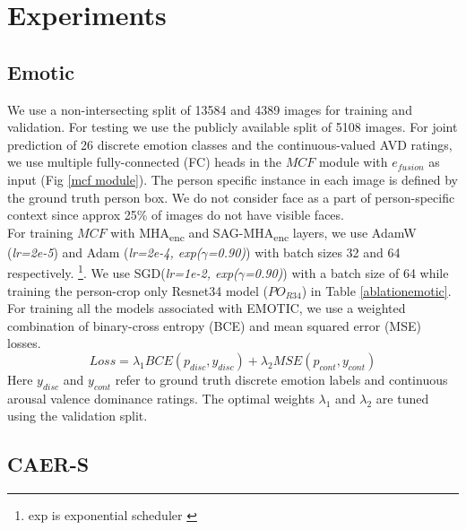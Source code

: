 \section{Experiments}
\subsection{Emotic}

We use a non-intersecting split of 13584 and 4389 images for training and validation. For testing we use the publicly available split of 5108 images. For joint prediction of 26 discrete emotion classes and the continuous-valued AVD ratings, we use multiple fully-connected (FC) heads in the $MCF$ module with $e_{fusion}$ as input (Fig \ref{mcf module}). The person specific instance in each image is defined by the ground truth person box. We do not consider face as a part of person-specific context since approx 25\% of images do not have visible faces. \\
For training $MCF$ with MHA\textsubscript{enc} and SAG-MHA\textsubscript{enc} layers, we use AdamW \cite{AdamW} (\textit{lr=2e-5}) and Adam \cite{Adam} (\textit{lr=2e-4,  exp($\gamma$=0.90)}) with batch sizes 32 and 64 respectively. \footnote{exp is exponential scheduler \label{note1}}. We use SGD(\textit{lr=1e-2, exp($\gamma$=0.90)}) with a batch size of 64 while training the person-crop only Resnet34 model ($PO_{R34}$) in Table \ref{ablationemotic}. For training all the models associated with EMOTIC, we use a weighted combination of binary-cross entropy (BCE) and mean squared error (MSE) losses.
\begin{equation}
Loss =\lambda_{1} BCE(p_{disc},y_{disc}) + \lambda_{2} MSE(p_{cont},y_{cont})
\end{equation}
Here $y_{disc}$ and $y_{cont}$ refer to ground truth discrete emotion labels and continuous arousal valence dominance ratings. The optimal weights $\lambda_{1}$ and $\lambda_{2}$ are tuned using the validation split. 

\subsection{CAER-S}

